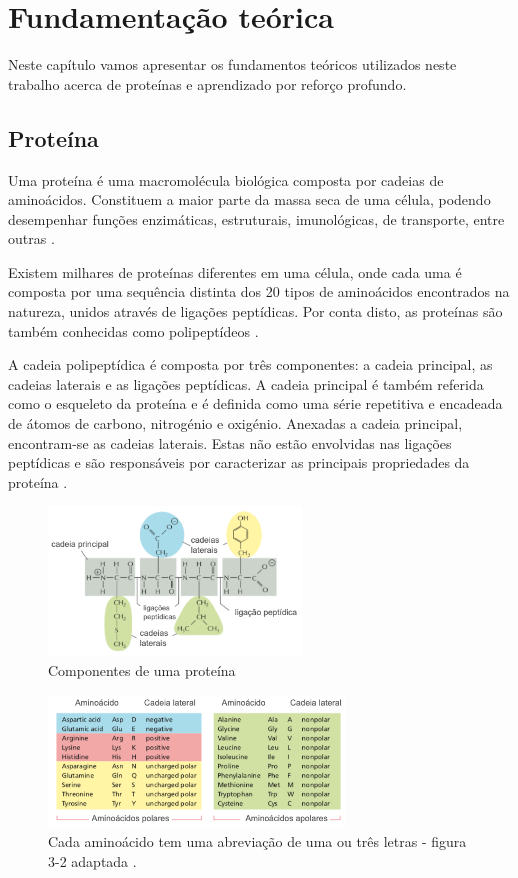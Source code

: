 \chapter{Fundamentação teórica}

Neste capítulo vamos apresentar os fundamentos teóricos utilizados neste trabalho acerca de proteínas e aprendizado por reforço profundo. 


\section{Proteína}
Uma proteína é uma macromolécula biológica composta por cadeias de aminoácidos. 
Constituem a maior parte da massa seca de uma célula, podendo desempenhar funções enzimáticas, estruturais,
imunológicas, de transporte, entre outras \cite{Bio}. 

Existem milhares de proteínas diferentes em uma célula,
onde cada uma é composta por uma sequência distinta dos 20 tipos de aminoácidos encontrados na natureza,
unidos através de ligações peptídicas.
Por conta disto, as proteínas são também conhecidas como polipeptídeos \cite{Bio}. 

A cadeia polipeptídica é composta por três componentes: a cadeia principal,
as cadeias laterais e as ligações peptídicas.
A cadeia principal é também referida como o esqueleto da proteína e
é definida como uma série repetitiva e encadeada de átomos de carbono,
nitrogénio e oxigénio. Anexadas a cadeia principal, encontram-se as cadeias laterais. 
Estas não estão envolvidas nas ligações peptídicas e são responsáveis por caracterizar as principais propriedades da proteína \cite{Bio}. 

\begin{figure}[H]
     \centering
     \includegraphics[width=0.6\textwidth]{figuras/ProteinBackbone.png}
     \caption{Componentes de uma proteína}
\end{figure}

\begin{figure}[H]
     \centering
     \includegraphics[width=0.7\textwidth]{figuras/20Aminoacidos.png}
     \caption[Aminiácidos]{Cada aminoácido tem uma abreviação de uma ou três letras - figura 3-2 adaptada \cite{Bio}.}
\end{figure}


